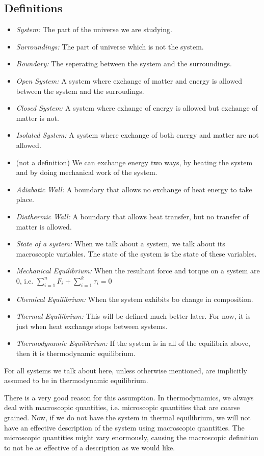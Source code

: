    \subsection{Definitions}
   \begin{itemize}
       \item \emph{System: } The part of the universe we are studying.
       \item \emph{Surroundings: }The part of universe which is not the system.
       \item \emph{Boundary: }The seperating between the system and the surroundings.
       \item \emph{Open System: }A system where exchange of matter and energy is allowed between the system and the surroudings.
       \item \emph{Closed System: }A system where exhange of energy is allowed but exchange of matter is not.
       \item \emph{Isolated System: }A system where exchange of both energy and matter are not allowed.
       \item (not a definition) We can exchange energy two ways, by heating the system and by doing mechanical work of the system.
       \item \emph{Adiabatic Wall: }A boundary that allows no exchange of heat energy to take place.
       \item \emph{Diathermic Wall: }A boundary that allows heat transfer, but no transfer of matter is allowed.
       \item \emph{State of a system: }When we talk about a system, we talk about its macroscopic variables. The state of the system is the state of these variables.
       \item \emph{Mechanical Equilibrium: }When the resultant force and torque on a system are 0, i.e. \(\sum_{i=1}^{n}F_i + \sum_{i=1}^{k}\tau_i = 0\)
       \item \emph{Chemical Equilibrium: }When the system exhibits bo change in composition.
       \item \emph{Thermal Equilibrium: }This will be defined much better later. For now, it is just when heat exchange stops between systems.
       \item \emph{Thermodynamic Equilibrium: }If the system is in all of the equilibria above, then it is thermodynamic equilibrium.
   \end{itemize}
   \begin{tcolorbox}[colback=blue!5!white,colframe=blue!75!black,arc=0mm,title=Note]
     For all systems we talk about here, unless otherwise mentioned, are implicitly assumed to be in thermodynamic equilibrium.
   \end{tcolorbox}
   There is a very good reason for this assumption. In thermodynamics, we always deal with macroscopic 
   quantities, i.e. microscopic quantities that are coarse grained. Now, if we do not have the system in 
   thermal equilibrium, we will not have an effective description of the system using macroscopic 
   quantities. The microscopic quantities might vary enormously, causing the macroscopic definition to 
   not be as effective of a description as we would like.
